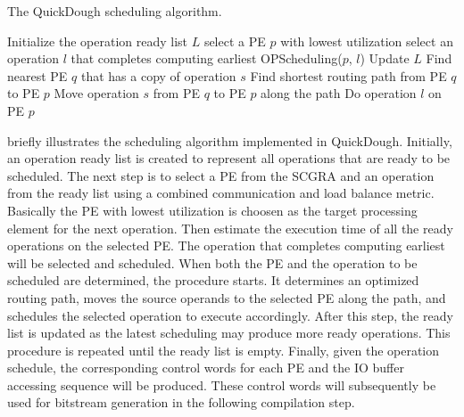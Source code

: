  \begin{algorithm}
 \small
 \caption{The QuickDough scheduling algorithm.}
 \label{alg:scheduling}
 \begin{algorithmic}
 \STATE Initialize the operation ready list $L$
 \STATE select a PE $p$ with lowest utilization
 \STATE select an operation $l$ that completes computing earliest
 \STATE OPScheduling($p$, $l$)
 \STATE Update $L$
 \ENDWHILE
 \ENDPROCEDURE
 \STATE
 \STATE Find nearest PE $q$ that has a copy of operation $s$
 \STATE Find shortest routing path from PE $q$ to PE $p$
 \STATE Move operation $s$ from PE $q$ to PE $p$ along the path
 \ENDFOR
 \STATE Do operation $l$ on PE $p$
 \ENDPROCEDURE

 \end{algorithmic}
 \end{algorithm}

 briefly illustrates the scheduling algorithm implemented in QuickDough. Initially, an operation ready list is created to represent all operations that are ready to be scheduled. The next step is to select a PE from the SCGRA and an operation from the ready list using a combined communication and load balance metric. Basically the PE with lowest utilization is choosen as the target processing element for the next operation. Then estimate the execution time of all the ready operations on the selected PE. The operation that completes computing earliest will be selected and scheduled. When both the PE and the operation to be scheduled are determined, the  procedure starts. It determines an optimized routing path, moves the source operands to the selected PE along the path, and schedules the selected operation to execute accordingly. After this step, the ready list is updated as the latest scheduling may produce more ready operations. This  procedure is repeated until the ready list is empty. Finally, given the operation schedule, the corresponding control words for each PE and the IO buffer accessing sequence will be produced. These control words will subsequently be used for bitstream generation in the following compilation step.

